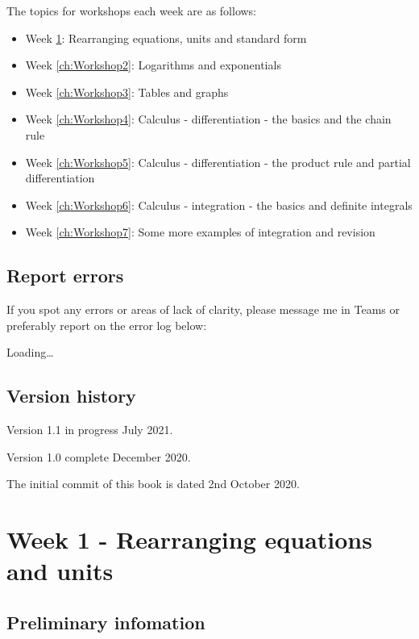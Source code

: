 \documentclass[
]{book}
\providecommand{\tightlist}{%
  \setlength{\itemsep}{0pt}\setlength{\parskip}{0pt}}
\begin{document}
The topics for workshops each week are as follows:

\begin{itemize}
\tightlist
\item
  Week \ref{ch:Workshop1}: Rearranging equations, units and standard form
\item
  Week \ref{ch:Workshop2}: Logarithms and exponentials
\item
  Week \ref{ch:Workshop3}: Tables and graphs
\item
  Week \ref{ch:Workshop4}: Calculus - differentiation - the basics and the chain rule
\item
  Week \ref{ch:Workshop5}: Calculus - differentiation - the product rule and partial differentiation
\item
  Week \ref{ch:Workshop6}: Calculus - integration - the basics and definite integrals
\item
  Week \ref{ch:Workshop7}: Some more examples of integration and revision
\end{itemize}

\hypertarget{report-errors}{%
\section*{Report errors}\label{report-errors}}

If you spot any errors or areas of lack of clarity, please message me in Teams or preferably report on the error log below:

Loading\ldots{}

\hypertarget{version-history}{%
\section*{Version history}\label{version-history}}

Version 1.1 in progress July 2021.

Version 1.0 complete December 2020.

The initial commit of this book is dated 2nd October 2020.

\hypertarget{ch:Workshop1}{%
\chapter{Week 1 - Rearranging equations and units}\label{ch:Workshop1}}

\hypertarget{sec:Prelim}{%
\section{Preliminary infomation}\label{sec:Prelim}}
\end{document}
